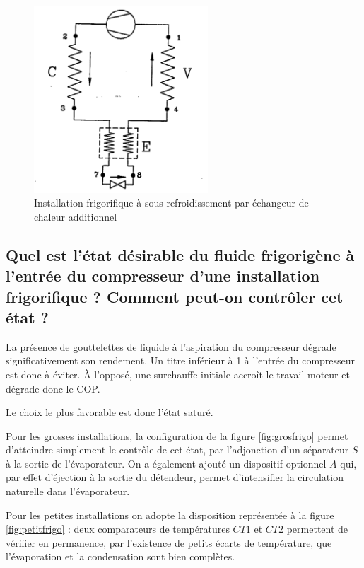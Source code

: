\begin{figure}[p]\centering
	\includegraphics[height=7cm]{figures/frigoechangeur}
	\caption{Installation frigorifique à sous-refroidissement par échangeur de chaleur additionnel}
	\label{fig:frigoechangeur}
\end{figure}

\subsection{Quel est l'état désirable du fluide frigorigène à l'entrée du compresseur d'une installation frigorifique ? Comment peut-on contrôler cet état ?}
La présence de gouttelettes de liquide à l'aspiration du compresseur dégrade significativement son rendement. Un titre inférieur à 1 à l'entrée du compresseur est donc à éviter. À l'opposé, une surchauffe initiale accroît le travail moteur et dégrade donc le COP. 

Le choix le plus favorable est donc l'état saturé.

Pour les grosses installations, la configuration de la figure \ref{fig:grosfrigo} permet d'atteindre simplement le contrôle de cet état, par l'adjonction d'un séparateur $S$ à la sortie de l'évaporateur. On a également ajouté un dispositif optionnel $A$ qui, par effet d'éjection à la sortie du détendeur, permet d'intensifier la circulation naturelle dans l'évaporateur.

Pour les petites installations on adopte la disposition représentée à la figure \ref{fig:petitfrigo} : deux comparateurs de températures $CT1$ et $CT2$ permettent de vérifier en permanence, par l'existence de petits écarts de température, que l'évaporation et la condensation sont bien complètes. 

